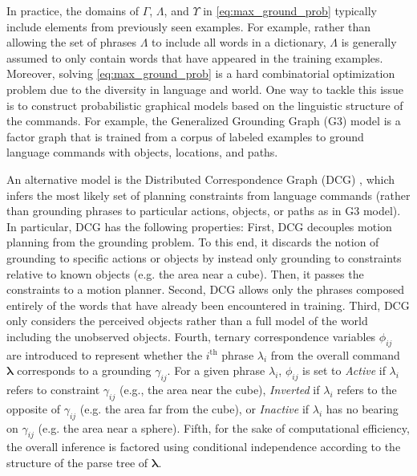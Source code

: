 In practice, the domains of $\Gamma$, $\Lambda$, and $\Upsilon$ in \eqref{eq:max_ground_prob} typically include elements from previously seen examples. %
For example, rather than allowing the set of phrases $\Lambda$ to include all words in a dictionary, $\Lambda$ is generally assumed to only contain words that have appeared in the training examples. Moreover, solving \eqref{eq:max_ground_prob} is a hard combinatorial optimization problem due to the diversity in language and world.
One way to tackle this issue is to construct probabilistic graphical models based on the linguistic structure of the commands. For example, the Generalized Grounding Graph (G3) model \cite{g3} is a factor graph that is trained from a corpus of labeled examples to ground language commands with objects, locations, and paths.  

An alternative model is the Distributed Correspondence Graph (DCG) \cite{dcg}, which infers the most likely set of planning constraints from language commands (rather than grounding phrases to particular actions, objects, or paths as in G3 model). In particular, DCG has the following properties:  
First, DCG decouples motion planning from the grounding problem. To this end, it discards the notion of grounding to specific actions or objects by instead only grounding to constraints relative to known objects (e.g. the area near a cube). Then, it passes the constraints to a motion planner.
Second, DCG allows only the phrases composed entirely of the words that have already been encountered in training.
Third, DCG only considers the perceived objects rather than a full model of the world including the unobserved objects.
Fourth, ternary correspondence variables $\phi_{ij}$ are introduced to represent whether the $i^\text{th}$ phrase $\lambda_i$ from the overall command $\boldsymbol{\lambda}$ corresponds to a grounding $\gamma_{ij}$.
For a given phrase $\lambda_i$, $\phi_{ij}$ is set to \emph{Active} if $\lambda_i$ refers to constraint $\gamma_{ij}$ (e.g., the area near the cube), \emph{Inverted} if $\lambda_i$ refers to the opposite of $\gamma_{ij}$ (e.g. the area far from the cube), or \emph{Inactive} if $\lambda_i$ has no bearing on $\gamma_{ij}$ (e.g. the area near a sphere).
Fifth, for the sake of computational efficiency, the overall inference is factored using conditional independence according to the structure of the parse tree of $\boldsymbol{\lambda}$.

